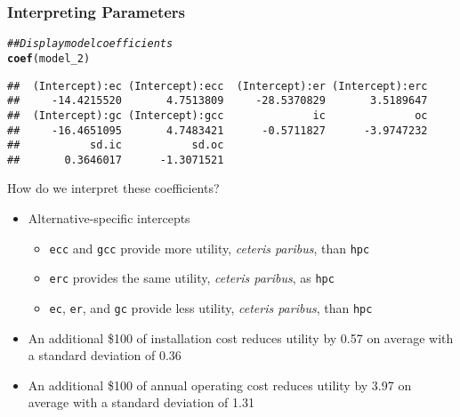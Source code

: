 \documentclass{beamer}\usepackage[]{graphicx}\usepackage[]{color}
\makeatletter
\newcommand{\hlcom}[1]{\textcolor[rgb]{0.678,0.584,0.686}{\textit{#1}}}%
\newcommand{\hlstd}[1]{\textcolor[rgb]{0.345,0.345,0.345}{#1}}%
\newcommand{\hlkwd}[1]{\textcolor[rgb]{0.737,0.353,0.396}{\textbf{#1}}}%
\newenvironment{kframe}{%
 \def\at@end@of@kframe{}%
 \ifinner\ifhmode%
  \def\at@end@of@kframe{\end{minipage}}%
  \begin{minipage}{\columnwidth}%
 \fi\fi%
 \def\FrameCommand##1{\hskip\@totalleftmargin \hskip-\fboxsep
 \colorbox{shadecolor}{##1}\hskip-\fboxsep
     \hskip-\linewidth \hskip-\@totalleftmargin \hskip\columnwidth}%
 \MakeFramed {\advance\hsize-\width
   \@totalleftmargin\z@ \linewidth\hsize
   \@setminipage}}%
 {\par\unskip\endMakeFramed%
 \at@end@of@kframe}
\newenvironment{knitrout}{}{} %
\makeatother
\begin{document}
\begin{frame}[fragile]\frametitle{Interpreting Parameters}
\begin{knitrout}\footnotesize
{}\color{fgcolor}\begin{kframe}
\begin{alltt}
\hlcom{## Display model coefficients}
\hlkwd{coef}\hlstd{(model_2)}
\end{alltt}
\begin{verbatim}
##  (Intercept):ec (Intercept):ecc  (Intercept):er (Intercept):erc 
##     -14.4215520       4.7513809     -28.5370829       3.5189647 
##  (Intercept):gc (Intercept):gcc              ic              oc 
##     -16.4651095       4.7483421      -0.5711827      -3.9747232 
##           sd.ic           sd.oc 
##       0.3646017      -1.3071521
\end{verbatim}
\end{kframe}
\end{knitrout}
    \vspace{2ex}
    How do we interpret these coefficients?
    \begin{itemize}
    	\item Alternative-specific intercepts
    	\begin{itemize}
    		\item \texttt{ecc} and \texttt{gcc} provide more utility, \emph{ceteris paribus}, than \texttt{hpc}
	        \item \texttt{erc} provides the same utility, \emph{ceteris paribus}, as \texttt{hpc}
	        \item \texttt{ec}, \texttt{er}, and \texttt{gc} provide less utility, \emph{ceteris paribus}, than \texttt{hpc}
    	\end{itemize}
        \item An additional \$100 of installation cost reduces utility by 0.57 on average with a standard deviation of 0.36
        \item An additional \$100 of annual operating cost reduces utility by 3.97 on average with a standard deviation of 1.31
    \end{itemize}
\end{frame}
\end{document}
